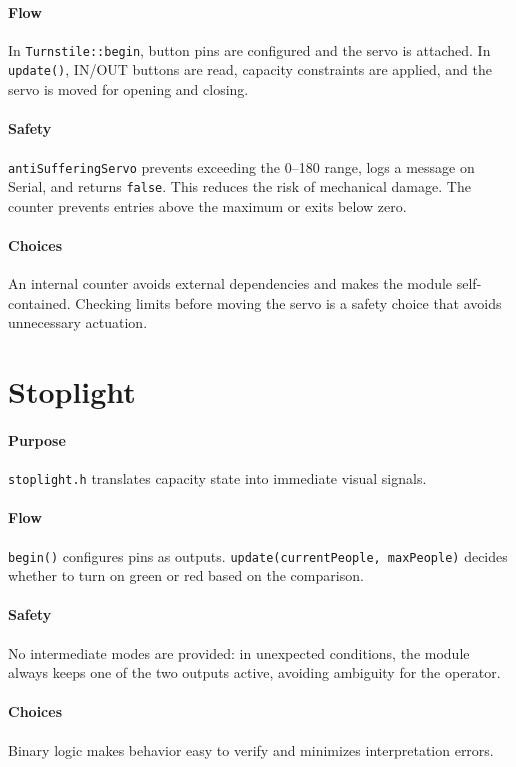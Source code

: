 \paragraph{Flow} In \texttt{Turnstile::begin}, button pins are configured and the servo is attached. In \texttt{update()}, IN/OUT buttons are read, capacity constraints are applied, and the servo is moved for opening and closing.

\paragraph{Safety} \texttt{antiSufferingServo} prevents exceeding the 0--180 range, logs a message on Serial, and returns \texttt{false}. This reduces the risk of mechanical damage. The counter prevents entries above the maximum or exits below zero.

\paragraph{Choices} An internal counter avoids external dependencies and makes the module self-contained. Checking limits before moving the servo is a safety choice that avoids unnecessary actuation.

\section{Stoplight}
\paragraph{Purpose} \texttt{stoplight.h} translates capacity state into immediate visual signals.

\paragraph{Flow} \texttt{begin()} configures pins as outputs. \texttt{update(currentPeople, maxPeople)} decides whether to turn on green or red based on the comparison.

\paragraph{Safety} No intermediate modes are provided: in unexpected conditions, the module always keeps one of the two outputs active, avoiding ambiguity for the operator.

\paragraph{Choices} Binary logic makes behavior easy to verify and minimizes interpretation errors.

